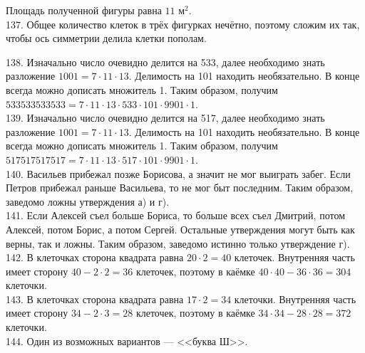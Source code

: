 \documentclass[12pt]{article}
\begin{document}
Площадь полученной фигуры равна $11\text{ м}^2.$\\
137. Общее количество клеток в трёх фигурках нечётно, поэтому сложим их так, чтобы ось симметрии делила клетки пополам.
\begin{center}
\begin{figure}[ht!]
\end{figure}
\end{center}
138. Изначально число очевидно делится на 533, далее необходимо знать разложение $1001=7\cdot11\cdot13.$ Делимость на 101 находить необязательно. В конце всегда можно дописать множитель 1. Таким образом, получим $533533533533=7\cdot11\cdot13\cdot533\cdot101\cdot9901\cdot1.$\\
139. Изначально число очевидно делится на 517, далее необходимо знать разложение $1001=7\cdot11\cdot13.$ Делимость на 101 находить необязательно. В конце всегда можно дописать множитель 1. Таким образом, получим $517517517517=7\cdot11\cdot13\cdot517\cdot101\cdot9901\cdot1.$\\
140. Васильев прибежал позже Борисова, а значит не мог выиграть забег. Если Петров прибежал раньше Васильева, то не мог быт последним. Таким образом, заведомо ложны утверждения а) и г).\\
141. Если Алексей съел больше Бориса, то больше всех съел Дмитрий, потом Алексей, потом Борис, а потом Сергей. Остальные утверждения могут быть как верны, так и ложны. Таким образом, заведомо истинно только утверждение г).\\
142. В клеточках сторона квадрата равна $20\cdot2=40$ клеточек. Внутренняя часть имеет сторону $40-2\cdot2=36$ клеточек, поэтому в каёмке $40\cdot40-36\cdot36=304$ клеточки.\\
143. В клеточках сторона квадрата равна $17\cdot2=34$ клеточки. Внутренняя часть имеет сторону $34-2\cdot3=28$ клеточек, поэтому в каёмке $34\cdot34-28\cdot28=372$ клеточки.\\
144. Один из возможных вариантов --- <<буква Ш>>.
\end{document}
